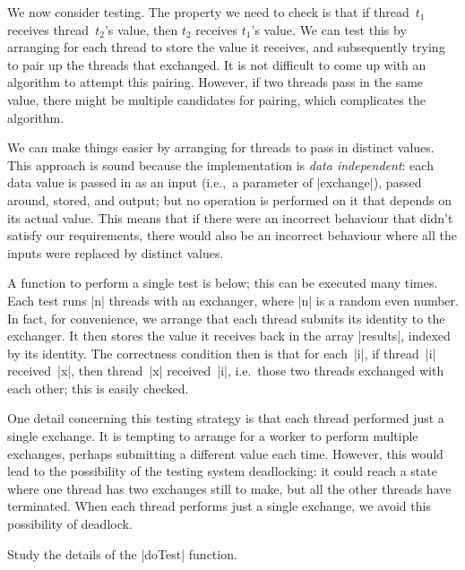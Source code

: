 
We now consider testing.  The property we need to check is that if
thread~$t_1$ receives thread~$t_2$'s value, then $t_2$ receives $t_1$'s value.
We can test this by arranging for each thread to store the value it receives,
and subsequently trying to pair up the threads that exchanged.  It is not
difficult to come up with an algorithm to attempt this pairing.  However, if
two threads pass in the same value, there might be multiple candidates for
pairing, which complicates the algorithm.  

We can make things easier by arranging for threads to pass in distinct values.
This approach is sound because the implementation is \emph{data independent}:
each data value is passed in as an input (i.e.,~a parameter of |exchange|),
passed around, stored, and output; but no operation is performed on it that
depends on its actual value.  This means that if there were an incorrect
behaviour that didn't satisfy our requirements, there would also be an
incorrect behaviour where all the inputs were replaced by distinct values.

A function to perform a single test is below; this can be executed many times.
Each test runs |n| threads with an exchanger, where |n| is a random even
number.  In fact, for convenience, we arrange that each thread submits its
identity to the exchanger.  It then stores the value it receives back in the
array |results|, indexed by its identity.  The correctness condition then is
that for each~|i|, if thread~|i| received~|x|, then thread~|x| received~|i|,
i.e.~those two threads exchanged with each other; this is easily checked.
%
%

One detail concerning this testing strategy is that each thread performed just
a single exchange.  It is tempting to arrange for a worker to perform multiple
exchanges, perhaps submitting a different value each time.  However, this would
lead to the possibility of the testing system deadlocking: it could reach a
state where one thread has two exchanges still to make, but all the other
threads have terminated.  When each thread performs just a single exchange, we
avoid this possibility of deadlock. 

\begin{instruction}
Study the details of the |doTest| function.
\end{instruction}
